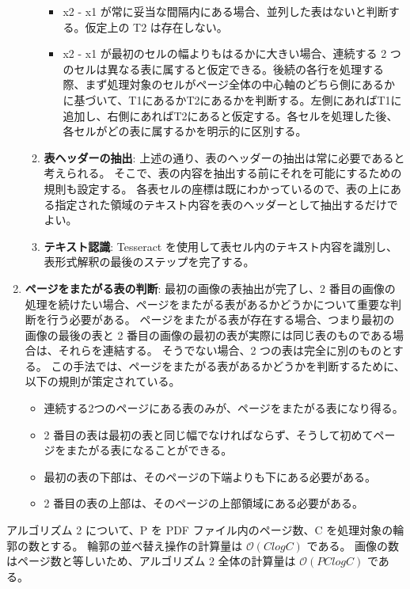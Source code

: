 \documentclass[uplatex, twocolumn,10pt]{jsarticle}
\begin{document}
\begin{enumerate}
\begin{enumerate}
\begin{itemize}
            \item x2 - x1 が常に妥当な間隔内にある場合、並列した表はないと判断する。仮定上の T2 は存在しない。
            \item x2 - x1 が最初のセルの幅よりもはるかに大きい場合、連続する 2 つのセルは異なる表に属すると仮定できる。後続の各行を処理する際、まず処理対象のセルがページ全体の中心軸のどちら側にあるかに基づいて、T1にあるかT2にあるかを判断する。左側にあればT1に追加し、右側にあればT2にあると仮定する。各セルを処理した後、各セルがどの表に属するかを明示的に区別する。
        \end{itemize}
        \item \textbf{表ヘッダーの抽出}:
        上述の通り、表のヘッダーの抽出は常に必要であると考えられる。
        そこで、表の内容を抽出する前にそれを可能にするための規則も設定する。
        各表セルの座標は既にわかっているので、表の上にある指定された領域のテキスト内容を表のヘッダーとして抽出するだけでよい。
        \item \textbf{テキスト認識}:
        Tesseract を使用して表セル内のテキスト内容を識別し、表形式解釈の最後のステップを完了する。
    \end{enumerate}
    \item \textbf{ページをまたがる表の判断}:
    最初の画像の表抽出が完了し、2 番目の画像の処理を続けたい場合、ページをまたがる表があるかどうかについて重要な判断を行う必要がある。
    ページをまたがる表が存在する場合、つまり最初の画像の最後の表と 2 番目の画像の最初の表が実際には同じ表のものである場合は、それらを連結する。
    そうでない場合、2 つの表は完全に別のものとする。
    この手法では、ページをまたがる表があるかどうかを判断するために、以下の規則が策定されている。
    \begin{itemize}
        \item 連続する2つのページにある表のみが、ページをまたがる表になり得る。
        \item 2 番目の表は最初の表と同じ幅でなければならず、そうして初めてページをまたがる表になることができる。
        \item 最初の表の下部は、そのページの下端よりも下にある必要がある。
        \item 2 番目の表の上部は、そのページの上部領域にある必要がある。
    \end{itemize}
\end{enumerate}

アルゴリズム 2 について、P を PDF ファイル内のページ数、C を処理対象の輪郭の数とする。
輪郭の並べ替え操作の計算量は $\mathcal{O} (C logC)$ である。
画像の数はページ数と等しいため、アルゴリズム 2 全体の計算量は $\mathcal{O} (PC logC)$ である。
\end{document}
